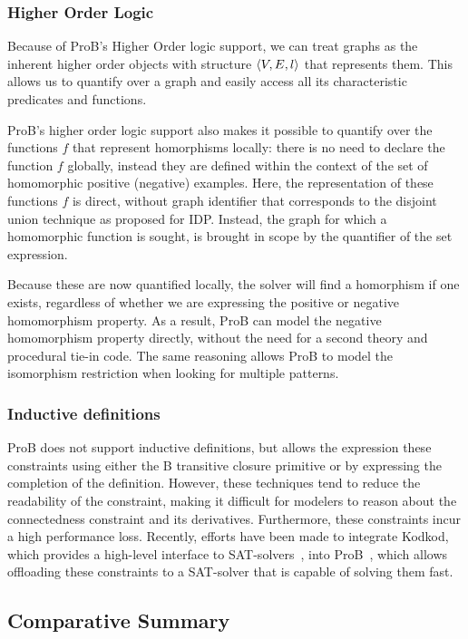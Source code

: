 \subsubsection{Higher Order Logic}
Because of ProB's Higher Order logic support, we can treat graphs as the inherent higher order objects with structure $\langle V,E,l \rangle$ that represents them.
This allows us to quantify over a graph and easily access all its characteristic predicates and functions.

ProB's higher order logic support also makes it possible to quantify over the functions $f$ that represent homorphisms locally: there is no need to declare the function $f$ globally, instead they are defined within the context of the set of homomorphic positive (negative) examples.
Here, the representation of these functions $f$ is direct, without graph identifier that corresponds to the disjoint union technique as proposed for IDP.
Instead, the graph  for which a homomorphic function is sought, is brought in scope by the quantifier of the set expression.

Because these are now quantified locally, the solver will find a homorphism if one exists, regardless of whether we are expressing the positive or negative homomorphism property.
As a result, ProB can model the negative homomorphism property directly, without the need for a second theory and procedural tie-in code.
The same reasoning allows ProB to model the isomorphism restriction when looking for multiple patterns.

\subsubsection{Inductive definitions}
ProB does not support inductive definitions, but allows the expression these constraints using either the B transitive closure primitive or by expressing the completion of the definition.
However, these techniques tend to reduce the readability of the constraint, making it difficult for modelers to reason about the connectedness constraint and its derivatives.
Furthermore, these constraints incur a high performance loss.
Recently, efforts have been made to integrate Kodkod, which provides a high-level interface to SAT-solvers~\citep{DBLP:conf/tacas/TorlakJ07}, into ProB~\citep{DBLP:conf/fm/PlaggeL12}, which allows offloading these constraints to a SAT-solver that is capable of solving them fast.


\subsection{Comparative Summary} %

